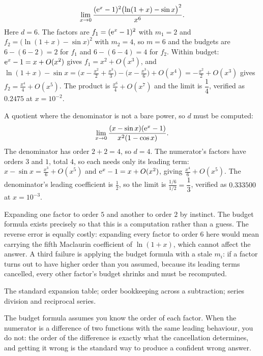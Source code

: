 \begin{worked}
\[
\lim_{x\to0}\frac{(\mathrm{e}^{x}-1)^{2}\bigl(\ln(1+x)-\sin x\bigr)^{2}}{x^{6}}.
\]
Here $d=6$. The factors are $f_1=(\mathrm{e}^{x}-1)^{2}$ with $m_1=2$ and $f_2=\bigl(\ln(1+x)-\sin x\bigr)^{2}$ with $m_2=4$, so $m=6$ and the budgets are $6-(6-2)=2$ for $f_1$ and $6-(6-4)=4$ for $f_2$. Within budget: $\mathrm{e}^{x}-1=x+O(x^{2})$ gives $f_1=x^{2}+O(x^{3})$, and $\ln(1+x)-\sin x=\bigl(x-\tfrac{x^{2}}{2}+\tfrac{x^{3}}{3}\bigr)-\bigl(x-\tfrac{x^{3}}{6}\bigr)+O(x^{4})=-\tfrac{x^{2}}{2}+O(x^{3})$ gives $f_2=\tfrac{x^{4}}{4}+O(x^{5})$. The product is $\tfrac{x^{6}}{4}+O(x^{7})$ and the limit is $\dfrac14$, verified as $0.2475$ at $x=10^{-2}$.

A quotient where the denominator is not a bare power, so $d$ must be computed:
\[
\lim_{x\to0}\frac{(x-\sin x)(\mathrm{e}^{x}-1)}{x^{2}(1-\cos x)}.
\]
The denominator has order $2+2=4$, so $d=4$. The numerator's factors have orders $3$ and $1$, total $4$, so each needs only its leading term: $x-\sin x=\tfrac{x^{3}}{6}+O(x^{5})$ and $\mathrm{e}^{x}-1=x+O(x^{2})$, giving $\tfrac{x^{4}}{6}+O(x^{5})$. The denominator's leading coefficient is $\tfrac12$, so the limit is $\tfrac{1/6}{1/2}=\dfrac13$, verified as $0.333500$ at $x=10^{-3}$.
\end{worked}

\begin{trap}
Expanding one factor to order $5$ and another to order $2$ by instinct. The budget formula exists precisely so that this is a computation rather than a guess. The reverse error is equally costly: expanding every factor to order $6$ here would mean carrying the fifth Maclaurin coefficient of $\ln(1+x)$, which cannot affect the answer. A third failure is applying the budget formula with a stale $m_i$: if a factor turns out to have higher order than you assumed, because its leading terms cancelled, every other factor's budget shrinks and must be recomputed.
\end{trap}

\begin{seealsob}The standard expansion table; order bookkeeping across a subtraction; series division and reciprocal series.\end{seealsob}

The budget formula assumes you know the order of each factor. When the numerator is a difference of two functions with the same leading behaviour, you do not: the order of the difference is exactly what the cancellation determines, and getting it wrong is the standard way to produce a confident wrong answer.

